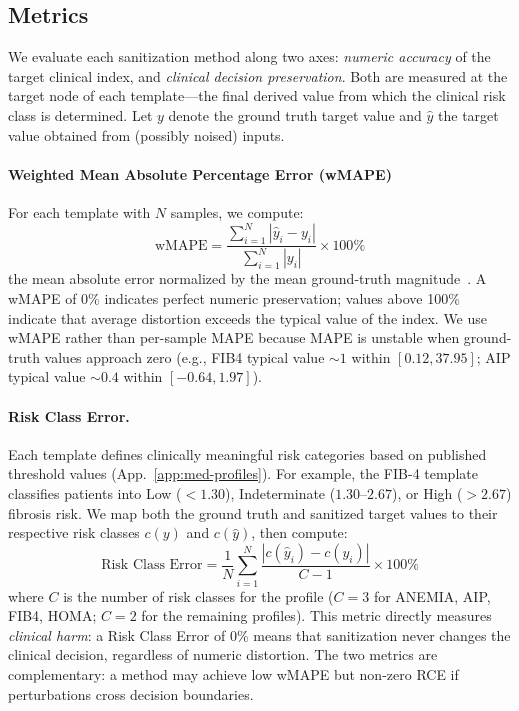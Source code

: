 \subsection{Metrics}
\label{sec:metrics}
We evaluate each sanitization method along two axes: \emph{numeric accuracy} of the target clinical index, and \emph{clinical decision preservation}. Both are measured at the target node of each template---the final derived value from which the clinical risk class is determined. Let $y$ denote the ground truth target value and $\hat{y}$ the target value obtained from (possibly noised) inputs.

\paragraph{Weighted Mean Absolute Percentage Error (wMAPE)}
For each template with $N$ samples, we compute:
\begin{equation}
\text{wMAPE} = \frac{\sum_{i=1}^{N} |\hat{y}_i - y_i|}{\sum_{i=1}^{N} |y_i|} \times 100\%
\end{equation}
the mean absolute error normalized by the mean ground-truth magnitude~\cite{hyndman2006another,kolassa2007advantages}. A wMAPE of 0\% indicates perfect numeric preservation; values above 100\% indicate that average distortion exceeds the typical value of the index. We use wMAPE rather than per-sample MAPE because MAPE is unstable when ground-truth values approach zero (e.g., FIB4 typical value ${\sim}1$ within $[0.12, 37.95]$; AIP typical value ${\sim}0.4$ within $[-0.64, 1.97]$).


\paragraph{Risk Class Error.}
Each template defines clinically meaningful risk categories based on published threshold values (App.~\ref{app:med-profiles}). For example, the FIB-4 template classifies patients into Low ($< 1.30$), Indeterminate ($1.30$--$2.67$), or High ($> 2.67$) fibrosis risk. We map both the ground truth and sanitized target values to their respective risk classes $c(y)$ and $c(\hat{y})$, then compute:
\begin{equation}
\text{Risk Class Error} = \frac{1}{N} \sum_{i=1}^{N} \frac{|c(\hat{y}_i) - c(y_i)|}{C - 1} \times 100\%
\end{equation}
where $C$ is the number of risk classes for the profile ($C = 3$ for ANEMIA, AIP, FIB4, HOMA; $C = 2$ for the remaining profiles). This metric directly measures \emph{clinical harm}: a Risk Class Error of 0\% means that sanitization never changes the clinical decision, regardless of numeric distortion. The two metrics are complementary: a method may achieve low wMAPE but non-zero RCE if perturbations cross decision boundaries.


